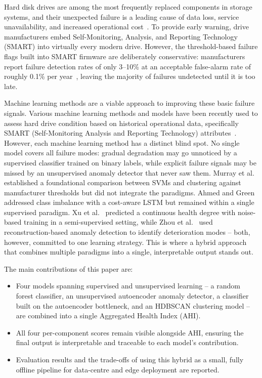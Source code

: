 \documentclass[sigconf,natbib=false]{acmart}
\begin{document}
Hard disk drives are among the most frequently replaced components in storage systems, and their unexpected failure is a leading cause of data loss, service unavailability, and increased operational cost~\cite{lu2020smarter}. To provide early warning, drive manufacturers embed Self-Monitoring, Analysis, and Reporting Technology (SMART) into virtually every modern drive. However, the threshold-based failure flags built into SMART firmware are deliberately conservative: manufacturers report failure detection rates of only 3--10\% at an acceptable false-alarm rate of roughly 0.1\% per year~\cite{murray2005}, leaving the majority of failures undetected until it is too late.

Machine learning methods are a viable approach to improving these basic failure signals. Various machine learning methods and models have been recently used to assess hard drive condition based on historical operational data, specifically SMART (Self-Monitoring Analysis and Reporting Technology) attributes~\cite{atekoja2024prediction}. However, each machine learning method has a distinct blind spot. No single model covers all failure modes: gradual degradation may go unnoticed by a supervised classifier trained on binary labels, while explicit failure signals may be missed by an unsupervised anomaly detector that never saw them. Murray et al.~\cite{murray2005} established a foundational comparison between SVMs and clustering against manufacturer thresholds but did not integrate the paradigms. Ahmed and Green~\cite{ahmed2024costaware} addressed class imbalance with a cost-aware LSTM but remained within a single supervised paradigm. Xu et al.~\cite{xu2018layerwise} predicted a continuous health degree with noise-based training in a semi-supervised setting, while Zhou et al.~\cite{zhou2024proactive} used reconstruction-based anomaly detection to identify deterioration modes -- both, however, committed to one learning strategy. This is where a hybrid approach that combines multiple paradigms into a single, interpretable output stands out.

The main contributions of this paper are:
\begin{itemize}
    \item Four models spanning supervised and unsupervised learning -- a random forest classifier, an unsupervised autoencoder anomaly detector, a classifier built on the autoencoder bottleneck, and an HDBSCAN clustering model -- are combined into a single Aggregated Health Index (AHI).
    \item All four per-component scores remain visible alongside AHI, ensuring the final output is interpretable and traceable to each model's contribution.
    \item Evaluation results and the trade-offs of using this hybrid as a small, fully offline pipeline for data-centre and edge deployment are reported.
\end{itemize}
\end{document}
